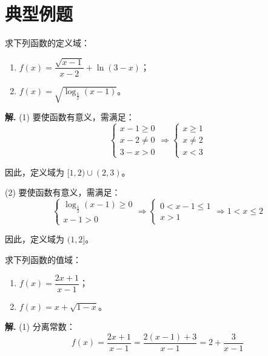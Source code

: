 \documentclass[11pt]{ctexrep}
\begin{document}
\section*{典型例题}

\begin{example}[求函数的定义域]
    求下列函数的定义域：
    \begin{enumerate}
        \item $f(x) = \dfrac{\sqrt{x-1}}{x-2} + \ln(3-x)$；
        \item $f(x) = \sqrt{\log_{\frac{1}{2}}(x-1)}$。
    \end{enumerate}
\end{example}

\textbf{解.} (1) 要使函数有意义，需满足：
\[
    \begin{cases}
        x - 1 \geq 0 \\[4pt]
        x - 2 \neq 0 \\[4pt]
        3 - x > 0
    \end{cases}
    \Rightarrow
    \begin{cases}
        x \geq 1 \\[4pt]
        x \neq 2 \\[4pt]
        x < 3
    \end{cases}
\]

因此，定义域为 $[1, 2) \cup (2, 3)$。

(2) 要使函数有意义，需满足：
\[
    \begin{cases}
        \log_{\frac{1}{2}}(x-1) \geq 0 \\[4pt]
        x - 1 > 0
    \end{cases}
    \Rightarrow
    \begin{cases}
        0 < x - 1 \leq 1 \\[4pt]
        x > 1
    \end{cases}
    \Rightarrow 1 < x \leq 2
\]

因此，定义域为 $(1, 2]$。

\begin{example}[求函数的值域]
    求下列函数的值域：
    \begin{enumerate}
        \item $f(x) = \dfrac{2x+1}{x-1}$；
        \item $f(x) = x + \sqrt{1-x}$。
    \end{enumerate}
\end{example}

\textbf{解.} (1) 分离常数：
\[
    f(x) = \frac{2x+1}{x-1} = \frac{2(x-1)+3}{x-1} = 2 + \frac{3}{x-1}
\]
\end{document}
